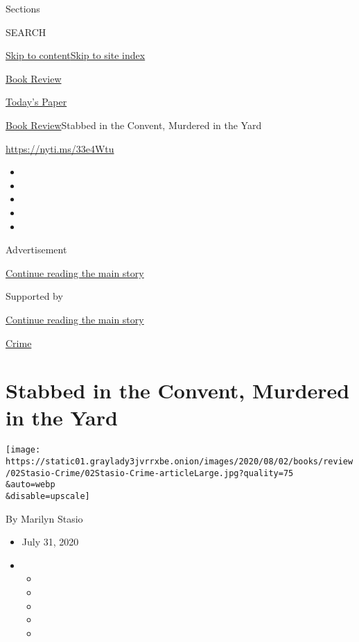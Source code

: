 Sections

SEARCH

\protect\hyperlink{site-content}{Skip to
content}\protect\hyperlink{site-index}{Skip to site index}

\href{https://www.nytimes3xbfgragh.onion/section/books/review}{Book
Review}

\href{https://myaccount.nytimes3xbfgragh.onion/auth/login?response_type=cookie\&client_id=vi}{}

\href{https://www.nytimes3xbfgragh.onion/section/todayspaper}{Today's
Paper}

\href{/section/books/review}{Book Review}\textbar{}Stabbed in the
Convent, Murdered in the Yard

\url{https://nyti.ms/33e4Wtu}

\begin{itemize}
\item
\item
\item
\item
\item
\end{itemize}

Advertisement

\protect\hyperlink{after-top}{Continue reading the main story}

Supported by

\protect\hyperlink{after-sponsor}{Continue reading the main story}

\href{/column/crime}{Crime}

\hypertarget{stabbed-in-the-convent-murdered-in-the-yard}{%
\section{Stabbed in the Convent, Murdered in the
Yard}\label{stabbed-in-the-convent-murdered-in-the-yard}}

\texttt{[image: https://static01.graylady3jvrrxbe.onion/images/2020/08/02/books/review/02Stasio-Crime/02Stasio-Crime-articleLarge.jpg?quality=75\\\&auto=webp\\\&disable=upscale]}

By Marilyn Stasio

\begin{itemize}
\item
  July 31, 2020
\item
  \begin{itemize}
  \item
  \item
  \item
  \item
  \item
  \end{itemize}
\end{itemize}

